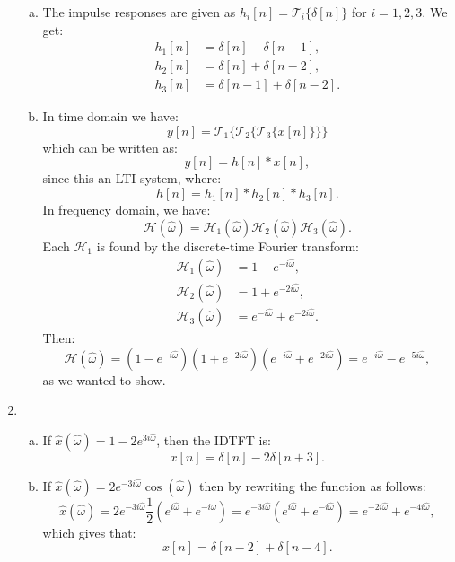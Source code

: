 \begin{enumerate}
\begin{enumerate}[a)]
\item The impulse responses are given as $h_{i}[n]=\mathcal{T}_{i}\{\delta[n]\}$ for $i=1,2,3$. We get:
\begin{align*}
    h_{1}[n]&=\delta[n]-\delta[n-1], \\
    h_{2}[n]&=\delta[n]+\delta[n-2], \\
    h_{3}[n]&=\delta[n-1]+\delta[n-2].
\end{align*}

\item In time domain we have:
$$y[n]=\mathcal{T}_{1}\{\mathcal{T}_{2}\{\mathcal{T}_{3}\{x[n]\}\}\}$$
which can be written as:
$$y[n]=h[n]*x[n],$$
since this an LTI system, where:
$$h[n]=h_{1}[n]*h_{2}[n]*h_{3}[n].$$
In frequency domain, we have:
$$\mathcal{H}(\hat{\omega})=\mathcal{H}_{1}(\hat{\omega})\mathcal{H}_{2}(\hat{\omega})\mathcal{H}_{3}(\hat{\omega}).$$
Each $\mathcal{H}_{1}$ is found by the discrete-time Fourier transform:
\begin{align*}
    \mathcal{H}_{1}(\hat{\omega})&=1-e^{-i\hat{\omega}}, \\
    \mathcal{H}_{2}(\hat{\omega})&=1+e^{-2i\hat{\omega}}, \\
    \mathcal{H}_{3}(\hat{\omega})&=e^{-i\hat{\omega}}+e^{-2i\hat{\omega}}.
\end{align*}
Then:
$$\mathcal{H}(\hat{\omega})=(1-e^{-i\hat{\omega}})(1+e^{-2i\hat{\omega}})(e^{-i\hat{\omega}}+e^{-2i\hat{\omega}})=e^{-i\hat{\omega}}-e^{-5i\hat{\omega}},$$
as we wanted to show. 
\end{enumerate}

\item

\begin{enumerate}[a)]
\item If $\hat{x}(\hat{\omega})=1-2e^{3i\hat{\omega}}$, then the IDTFT is:
$$x[n]=\delta[n]-2\delta[n+3].$$

\item If $\hat{x}(\hat{\omega})=2e^{-3i\hat{\omega}}\cos(\hat{\omega})$ then by rewriting the function as follows:
$$\hat{x}(\hat{\omega})=2e^{-3i\hat{\omega}}\frac{1}{2}(e^{i\hat{\omega}}+e^{-i\hat{\omega}})=e^{-3i\hat{\omega}}(e^{i\hat{\omega}}+e^{-i\hat{\omega}})=e^{-2i\hat{\omega}}+e^{-4i\hat{\omega}},$$
which gives that:
$$x[n]=\delta[n-2]+\delta[n-4].$$


\end{enumerate}
\end{enumerate}
